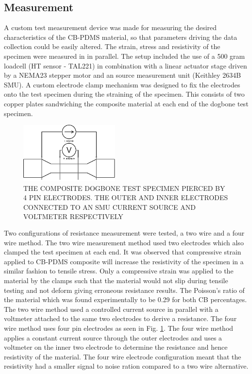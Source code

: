 \subsection*{Measurement}
A custom test measurement device was made for measuring the desired characteristics of the CB-PDMS material, so that parameters driving the data collection could be easily altered. The strain, stress and resistivity of the specimen were measured in in parallel. The setup included the use of a 500 gram loadcell (HT sensor - TAL221) in combination with a linear actuator stage driven by a NEMA23 stepper motor and an source measurement unit (Keithley 2634B SMU). A custom electrode clamp mechanism was designed to fix the electrodes onto the test specimen during the straining of the specimen. This consists of two copper plates sandwiching the composite material at each end of the dogbone test specimen.
\begin{figure}[H]
	\centering
	\includegraphics[width=5cm]{Figures/4wire_specimen.png}
	\caption{THE COMPOSITE DOGBONE TEST SPECIMEN PIERCED BY 4 PIN ELECTRODES. THE OUTER AND INNER ELECTRODES CONNECTED TO AN SMU CURRENT SOURCE AND VOLTMETER RESPECTIVELY}
	\label{fig:four_wire_dogbone}
\end{figure}
Two configurations of resistance measurement were tested, a two wire and a four wire method. The two wire measurement method used two electrodes which also clamped the test specimen at each end. It was observed that compressive strain applied to CB-PDMS composite will increase the resistivity of the specimen in a similar fashion to tensile stress. Only a compressive strain was applied to the material by the clamps such that the material would not slip during tensile testing and not deform giving erroneous resistance results. The Poisson's ratio of the material which was found experimentally to be 0.29 for both CB percentages. The two wire method used a controlled current source in parallel with a voltmeter attached to the same two electrodes to derive a resistance. The four wire method uses four pin electrodes as seen in Fig. \ref{fig:four_wire_dogbone}. The four wire method applies a constant current source through the outer electrodes and uses a voltmeter on the inner two electrode to determine the resistance and hence resistivity of the material. The four wire electrode configuration meant that the resistivity had a smaller signal to noise ration compared to a two wire alternative. 

